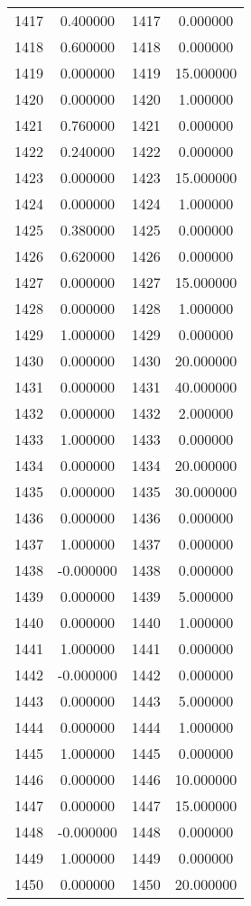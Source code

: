 \documentclass[12pt]{article}
\begin{document}
\begin{longtable}{@{}cccc@{}}
1417 & 0.400000 & 1417 & 0.000000 \\
1418 & 0.600000 & 1418 & 0.000000 \\
1419 & 0.000000 & 1419 & 15.000000 \\
1420 & 0.000000 & 1420 & 1.000000 \\
1421 & 0.760000 & 1421 & 0.000000 \\
1422 & 0.240000 & 1422 & 0.000000 \\
1423 & 0.000000 & 1423 & 15.000000 \\
1424 & 0.000000 & 1424 & 1.000000 \\
1425 & 0.380000 & 1425 & 0.000000 \\
1426 & 0.620000 & 1426 & 0.000000 \\
1427 & 0.000000 & 1427 & 15.000000 \\
1428 & 0.000000 & 1428 & 1.000000 \\
1429 & 1.000000 & 1429 & 0.000000 \\
1430 & 0.000000 & 1430 & 20.000000 \\
1431 & 0.000000 & 1431 & 40.000000 \\
1432 & 0.000000 & 1432 & 2.000000 \\
1433 & 1.000000 & 1433 & 0.000000 \\
1434 & 0.000000 & 1434 & 20.000000 \\
1435 & 0.000000 & 1435 & 30.000000 \\
1436 & 0.000000 & 1436 & 0.000000 \\
1437 & 1.000000 & 1437 & 0.000000 \\
1438 & -0.000000 & 1438 & 0.000000 \\
1439 & 0.000000 & 1439 & 5.000000 \\
1440 & 0.000000 & 1440 & 1.000000 \\
1441 & 1.000000 & 1441 & 0.000000 \\
1442 & -0.000000 & 1442 & 0.000000 \\
1443 & 0.000000 & 1443 & 5.000000 \\
1444 & 0.000000 & 1444 & 1.000000 \\
1445 & 1.000000 & 1445 & 0.000000 \\
1446 & 0.000000 & 1446 & 10.000000 \\
1447 & 0.000000 & 1447 & 15.000000 \\
1448 & -0.000000 & 1448 & 0.000000 \\
1449 & 1.000000 & 1449 & 0.000000 \\
1450 & 0.000000 & 1450 & 20.000000 \\

\end{longtable}
\end{document}
